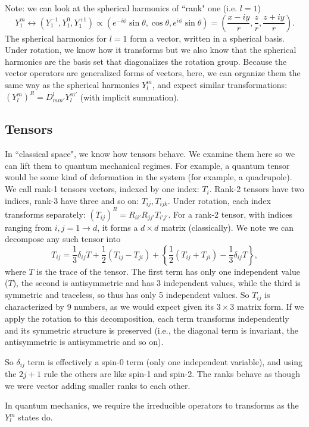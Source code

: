 \documentclass[fontsize=12pt]{scrartcl}
\begin{document}
Note: we can look at the spherical harmonics of ``rank" one (i.e. $l=1$) $$Y_1^m\leftrightarrow (Y_1^{-1}, Y_1^0,Y_1^{+1})\propto (e^{-i\phi}\sin\theta,\cos\theta,e^{i\phi}\sin\theta)=\left(\frac{x-iy}{r},\frac{z}{r},\frac{z+iy}{r}\right).$$ The spherical harmonics for $l=1$ form a vector, written in a spherical basis. Under rotation, we know how it transforms but we also know that the spherical harmonics are the basis set that diagonalizes the rotation group. Because the vector operators are generalized forms of vectors, here, we can organize them the same way as the spherical harmonics $Y_l^m$, and expect similar transformations: $(Y_l^m)^R=D_{mm'}^lY_l^{m'}$ (with implicit summation).

\subsection{Tensors}

In ``classical space", we know how tensors behave. We examine them here so we can lift them to quantum mechanical regimes. For example, a quantum tensor would be some kind of deformation in the system (for example, a quadrupole). We call rank-1 tensors vectors, indexed by one index: $T_i$. Rank-2 tensors have two indices, rank-3 have three and so on: $T_{ij}, T_{ijk}$. Under rotation, each index transforms separately: $(T_{ij})^R=R_{ii'}R_{jj'}T_{i'j'}.$ For a rank-2 tensor, with indices ranging from $i,j=1\to d$, it forms a $d\times d$ matrix (classically). We note we can decompose any such tensor into $$T_{ij}=\frac{1}{3}\delta_{ij}T+\frac{1}{2}\left(T_{ij}-T_{ji}\right) +\left\{\frac{1}{2}\left(T_{ij}+T_{ji}\right)-\frac{1}{3}\delta_{ij}T\right\},$$ where $T$ is the trace of the tensor. The first term has only one independent value ($T$), the second is antisymmetric and has $3$ independent values, while the third is symmetric and traceless, so thus has only 5 independent values. So $T_{ij}$ is characterized by 9 numbers, as we would expect given its $3\times 3$ matrix form. If we apply the rotation to this decomposition, each term transforms independently and its symmetric structure is preserved (i.e., the diagonal term is invariant, the antisymmetric is antisymmetric and so on).

So $\delta_{ij}$ term is effectively a spin-0 term (only one independent variable), and using the $2j+1$ rule the others are like spin-1 and spin-2. The ranks behave as though we were vector adding smaller ranks to each other.

In quantum mechanics, we require the irreducible operators to transforms as the $Y_l^m$ states do.
\end{document}
